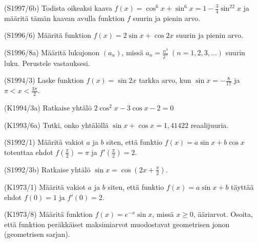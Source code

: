 \begin{tehtava} (S1997/6b)
	Todista oikeaksi kaava $f(x)=\cos^6x+\sin^6x=1-\frac{3}{4}\sin^22x$ ja määritä tämän kaavan avulla funktion $f$ 
	suurin ja pienin arvo.
\end{tehtava}

\begin{tehtava} (S1996/6)
	Määritä funktion $f(x)=2\sin x+\cos2x$ suurin ja pienin arvo.
\end{tehtava}

\begin{tehtava} (S1996/8a)
	Määritä lukujonon $(a_n)$, missä $a_n=\frac{n^4}{2^n} \; (n=1,2,3,\ldots)$ suurin luku. Perustele vastauksesi.
\end{tehtava}

\begin{tehtava} (S1994/3)
	Laske funktion $f(x)=\sin2x$ tarkka arvo, kun $\sin x=-\frac{8}{17}$ ja $\pi<x<\frac{3\pi}{2}$.
\end{tehtava}

\begin{tehtava} (K1994/3a)
	Ratkaise yhtälö $2\cos^2x-3\cos x-2=0$
\end{tehtava}

\begin{tehtava} (K1993/6a)
	Tutki, onko yhtälöllä $\sin x+\cos x=1,41422$ reaalijuuria.
\end{tehtava}

\begin{tehtava} (S1992/1)
	Määritä vakiot $a$ ja $b$ siten, että funktio $f(x)=a\sin x+b\cos x$ toteuttaa ehdot $f(\frac{\pi}{2})=\pi$ 
	ja $f'(\frac{\pi}{2})=2$.
\end{tehtava}

\begin{tehtava} (S1992/3b)
	Ratkaise yhtälö $\sin x=\cos(2x+\frac{\pi}{2})$.
\end{tehtava}

\begin{tehtava} (K1973/1)
	Määritä vakiot $a$ ja $b$ siten, että funktio $f(x)=a\sin x+b$ täyttää ehdot $f(0)=1$ ja $f'(0)=2$.
\end{tehtava}

\begin{tehtava} (K1973/8)
	Määritä funktion $f(x)=e^{-x}\sin x$, missä $x\geq0$, ääriarvot. Osoita, että funktion peräkkäiset maksimiarvot muodostavat 
	geometrisen jonon (geometrisen sarjan).
\end{tehtava}

